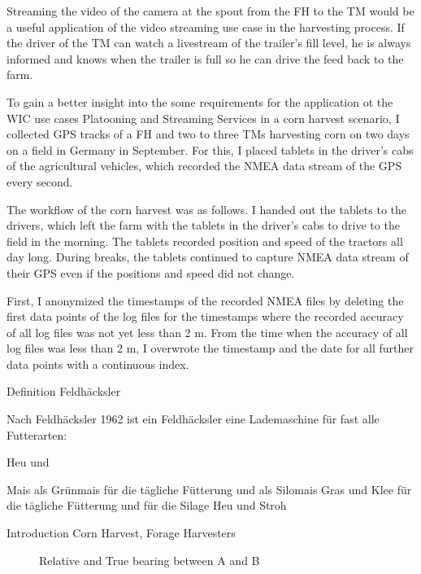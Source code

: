 \documentclass[]{nsm-thesis}
\begin{document}
Streaming the video of the camera at the spout from the \ac{FH} to the \ac{TM} would be a useful application of the video streaming use case in the harvesting process. If the driver of the \ac{TM} can watch a livestream of the trailer's fill level, he is always informed and knows when the trailer is full so he can drive the feed back to the farm.

To gain a better insight into the some requirements for the application ot the \ac{WIC} use cases Platooning and Streaming Services in a corn harvest scenario, I collected GPS tracks of a \ac{FH} and two to three \ac{TM}s harvesting corn on two days on a field in Germany in September. For this, I placed tablets in the driver's cabs of the agricultural vehicles, which recorded the NMEA data stream of the GPS every second. 

The workflow of the corn harvest was as follows. 
I handed out the tablets to the drivers, which left the farm with the tablets in the driver's cabs to drive to the field in the morning. The tablets recorded position and speed of the tractors all day long. During breaks, the tablets continued to capture NMEA data stream of their GPS even if the positions and speed did not change.

First, I anonymized the timestamps of the recorded NMEA files by deleting the first data points of the log files for the timestamps where the recorded accuracy of all log files was not yet less than 2 m. From the time when the accuracy of all log files was less than 2 m, I overwrote the timestamp and the date for all further data points with a continuous index.


Definition Feldhäcksler


Nach Feldhäcksler 1962 ist ein Feldhäcksler eine Lademaschine für fast alle Futterarten:

Heu und

Mais als Grünmais für die tägliche Fütterung und als Silomais
Gras und Klee für die tägliche Fütterung und für die Silage
Heu und Stroh 

Introduction Corn Harvest, Forage Harvesters

\begin{figure}%
	\centering
	\caption{Relative and True bearing between A and B}%
	\label{fig:bearing_fh_tm}%
\end{figure}
\end{document}
